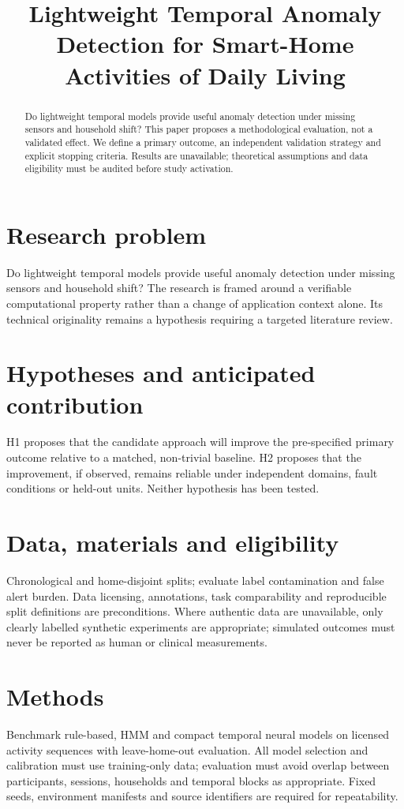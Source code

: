\documentclass[11pt,a4paper]{article}
\title{Lightweight Temporal Anomaly Detection for Smart-Home Activities of Daily Living}
\author{}
\date{}
\begin{document}
\maketitle
\begin{abstract}
Do lightweight temporal models provide useful anomaly detection under missing sensors and household shift? This paper proposes a methodological evaluation, not a validated effect. We define a primary outcome, an independent validation strategy and explicit stopping criteria. Results are unavailable; theoretical assumptions and data eligibility must be audited before study activation.
\end{abstract}
\section{Research problem}
Do lightweight temporal models provide useful anomaly detection under missing sensors and household shift? The research is framed around a verifiable computational property rather than a change of application context alone. Its technical originality remains a hypothesis requiring a targeted literature review.
\section{Hypotheses and anticipated contribution}
H1 proposes that the candidate approach will improve the pre-specified primary outcome relative to a matched, non-trivial baseline. H2 proposes that the improvement, if observed, remains reliable under independent domains, fault conditions or held-out units. Neither hypothesis has been tested.
\section{Data, materials and eligibility}
Chronological and home-disjoint splits; evaluate label contamination and false alert burden. Data licensing, annotations, task comparability and reproducible split definitions are preconditions. Where authentic data are unavailable, only clearly labelled synthetic experiments are appropriate; simulated outcomes must never be reported as human or clinical measurements.
\section{Methods}
Benchmark rule-based, HMM and compact temporal neural models on licensed activity sequences with leave-home-out evaluation. All model selection and calibration must use training-only data; evaluation must avoid overlap between participants, sessions, households and temporal blocks as appropriate. Fixed seeds, environment manifests and source identifiers are required for repeatability.
\end{document}
